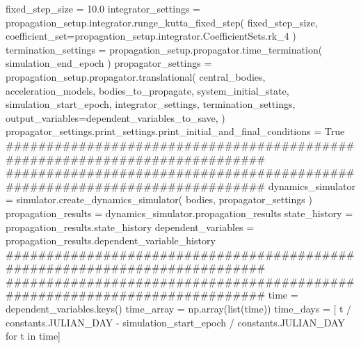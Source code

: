 {}
\markdownRendererSectionEnd \markdownRendererSectionBegin
{}\markdownRendererInterblockSeparator
{}fixed_step_size = 10.0 integrator_settings = propagation_setup.integrator.runge_kutta_fixed_step( fixed_step_size, coefficient_set=propagation_setup.integrator.CoefficientSets.rk_4 )\markdownRendererInterblockSeparator
{}
\markdownRendererSectionEnd \markdownRendererSectionBegin
{}\markdownRendererInterblockSeparator
{}termination_settings = propagation_setup.propagator.time_termination( simulation_end_epoch ) propagator_settings = propagation_setup.propagator.translational( central_bodies, acceleration_models, bodies_to_propagate, system_initial_state, simulation_start_epoch, integrator_settings, termination_settings, output_variables=dependent_variables_to_save, ) propagator_settings.print_settings.print_initial_and_final_conditions = True\markdownRendererInterblockSeparator
{}###########################################################################\markdownRendererInterblockSeparator
{}
\markdownRendererSectionEnd \markdownRendererSectionBegin
{}\markdownRendererInterblockSeparator
{}###########################################################################\markdownRendererInterblockSeparator
{}
\markdownRendererSectionEnd \markdownRendererSectionBegin
{}\markdownRendererInterblockSeparator
{}dynamics_simulator = simulator.create_dynamics_simulator( bodies, propagator_settings )\markdownRendererInterblockSeparator
{}
\markdownRendererSectionEnd \markdownRendererSectionBegin
{}\markdownRendererInterblockSeparator
{}propagation_results = dynamics_simulator.propagation_results\markdownRendererInterblockSeparator
{}
\markdownRendererSectionEnd \markdownRendererSectionBegin
{}\markdownRendererInterblockSeparator
{}state_history = propagation_results.state_history dependent_variables = propagation_results.dependent_variable_history\markdownRendererInterblockSeparator
{}###########################################################################\markdownRendererInterblockSeparator
{}
\markdownRendererSectionEnd \markdownRendererSectionBegin
{}\markdownRendererInterblockSeparator
{}########################################################################### time = dependent_variables.keys() time_array = np.array(list(time)) time_days = [ t / constants.JULIAN_DAY - simulation_start_epoch / constants.JULIAN_DAY for t in time]\markdownRendererInterblockSeparator
